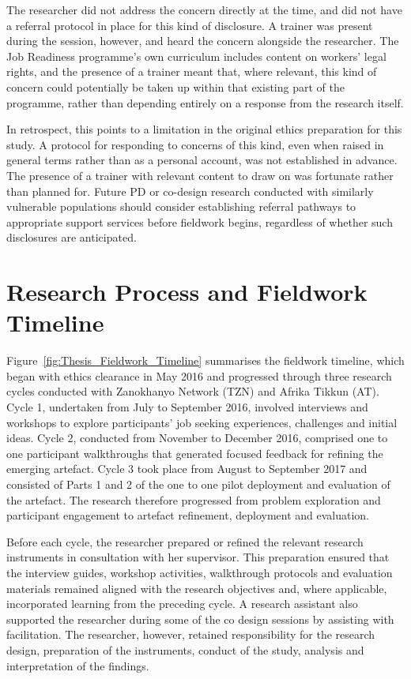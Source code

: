 The researcher did not address the concern directly at the time, and did not have a referral protocol in place for this kind of disclosure. A trainer was present during the session, however, and heard the concern alongside the researcher. The Job Readiness programme's own curriculum includes content on workers' legal rights, and the presence of a trainer meant that, where relevant, this kind of concern could potentially be taken up within that existing part of the programme, rather than depending entirely on a response from the research itself.

In retrospect, this points to a limitation in the original ethics preparation for this study. A protocol for responding to concerns of this kind, even when raised in general terms rather than as a personal account, was not established in advance. The presence of a trainer with relevant content to draw on was fortunate rather than planned for. Future PD or co-design research conducted with similarly vulnerable populations should consider establishing referral pathways to appropriate support services before fieldwork begins, regardless of whether such disclosures are anticipated.

\section{Research Process and Fieldwork Timeline}
\label{sec:fieldwork-timeline}

Figure~\ref{fig:Thesis_Fieldwork_Timeline} summarises the fieldwork timeline, which began with ethics clearance in May 2016 and progressed through three research cycles conducted with Zanokhanyo Network (TZN) and Afrika Tikkun (AT). Cycle 1, undertaken from July to September 2016, involved interviews and workshops to explore participants' job seeking experiences, challenges and initial ideas. Cycle 2, conducted from November to December 2016, comprised one to one participant walkthroughs that generated focused feedback for refining the emerging artefact. Cycle 3 took place from August to September 2017 and consisted of Parts 1 and 2 of the one to one pilot deployment and evaluation of the artefact. The research therefore progressed from problem exploration and participant engagement to artefact refinement, deployment and evaluation.

Before each cycle, the researcher prepared or refined the relevant research instruments in consultation with her supervisor. This preparation ensured that the interview guides, workshop activities, walkthrough protocols and evaluation materials remained aligned with the research objectives and, where applicable, incorporated learning from the preceding cycle. A research assistant also supported the researcher during some of the co design sessions by assisting with facilitation. The researcher, however, retained responsibility for the research design, preparation of the instruments, conduct of the study, analysis and interpretation of the findings.

